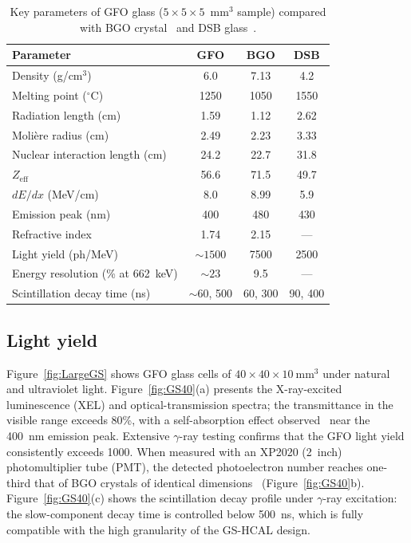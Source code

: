 \documentclass[preprint,12pt,times]{elsarticle}
\newcommand{\cellsize}{\ensuremath{40\times40\times10~\text{mm}^{3}}\xspace}
\begin{document}
\begin{table}[htbp]
\centering
\caption{Key parameters of GFO glass ($5\times5\times5$~mm$^{3}$ sample)
compared with BGO crystal~\cite{BGO} and DSB
glass~\cite{Dormenev:2021vtn}.}
\label{tab:GS1}
\begin{tabular}{lccc}
\toprule
\textbf{Parameter} & \textbf{GFO} & \textbf{BGO} & \textbf{DSB} \\
\midrule
Density (g/cm$^{3}$)                       & 6.0      & 7.13  & 4.2   \\
Melting point ($^{\circ}$C)                 & 1250     & 1050  & 1550  \\
Radiation length (cm)                       & 1.59     & 1.12  & 2.62  \\
Moli\`{e}re radius (cm)                    & 2.49     & 2.23  & 3.33  \\
Nuclear interaction length (cm)             & 24.2     & 22.7  & 31.8  \\
$Z_{\mathrm{eff}}$                          & 56.6     & 71.5  & 49.7  \\
$dE/dx$ (MeV/cm)                            & 8.0      & 8.99  & 5.9   \\
Emission peak (nm)                          & 400      & 480   & 430   \\
Refractive index                            & 1.74     & 2.15  & ---   \\
Light yield (ph/MeV)                        & ${\sim}1500$ & 7500  & 2500  \\
Energy resolution (\% at \SI{662}{keV})     & ${\sim}23$   & 9.5   & ---   \\
Scintillation decay time (ns)               & ${\sim}60$, 500 & 60, 300 & 90, 400 \\
\bottomrule
\end{tabular}
\end{table}

\subsection{Light yield}
\label{subsec:lightyield}

Figure~\ref{fig:LargeGS} shows GFO glass cells of \cellsize under
natural and ultraviolet light.
Figure~\ref{fig:GS40}(a) presents the X-ray-excited luminescence (XEL)
and optical-transmission spectra; the transmittance in the visible range
exceeds 80\%, with a self-absorption effect
observed~\cite{SUI2025100878} near the \SI{400}{nm} emission peak.
Extensive $\gamma$-ray testing confirms that the GFO light yield
consistently exceeds \SI{1000}{\phMeV}.
When measured with an XP2020 (\SI{2}{inch}) photomultiplier tube (PMT),
the detected photoelectron number reaches one-third that of BGO crystals
of identical dimensions~\cite{GS-5}
(Figure~\ref{fig:GS40}b).
Figure~\ref{fig:GS40}(c) shows the scintillation decay profile under
$\gamma$-ray excitation: the slow-component decay time is controlled
below \SI{500}{ns}, which is fully compatible with the high granularity
of the GS-HCAL design.
\end{document}
